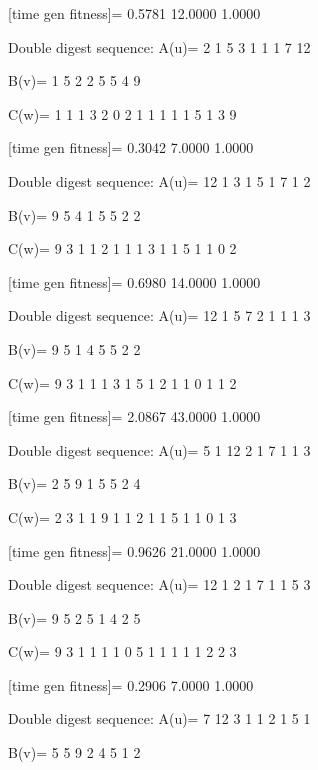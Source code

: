 [time gen fitness]=
    0.5781   12.0000    1.0000

Double digest sequence:
A(u)=
     2     1     5     3     1     1     1     7    12

B(v)=
     1     5     2     2     5     5     4     9

C(w)=
     1     1     1     3     2     0     2     1     1     1     1     1     5     1     3     9

[time gen fitness]=
    0.3042    7.0000    1.0000

Double digest sequence:
A(u)=
    12     1     3     1     5     1     7     1     2

B(v)=
     9     5     4     1     5     5     2     2

C(w)=
     9     3     1     1     2     1     1     1     3     1     1     5     1     1     0     2

[time gen fitness]=
    0.6980   14.0000    1.0000

Double digest sequence:
A(u)=
    12     1     5     7     2     1     1     1     3

B(v)=
     9     5     1     4     5     5     2     2

C(w)=
     9     3     1     1     1     3     1     5     1     2     1     1     0     1     1     2

[time gen fitness]=
    2.0867   43.0000    1.0000

Double digest sequence:
A(u)=
     5     1    12     2     1     7     1     1     3

B(v)=
     2     5     9     1     5     5     2     4

C(w)=
     2     3     1     1     9     1     1     2     1     1     5     1     1     0     1     3

[time gen fitness]=
    0.9626   21.0000    1.0000

Double digest sequence:
A(u)=
    12     1     2     1     7     1     1     5     3

B(v)=
     9     5     2     5     1     4     2     5

C(w)=
     9     3     1     1     1     1     0     5     1     1     1     1     1     2     2     3

[time gen fitness]=
    0.2906    7.0000    1.0000

Double digest sequence:
A(u)=
     7    12     3     1     1     2     1     5     1

B(v)=
     5     5     9     2     4     5     1     2

